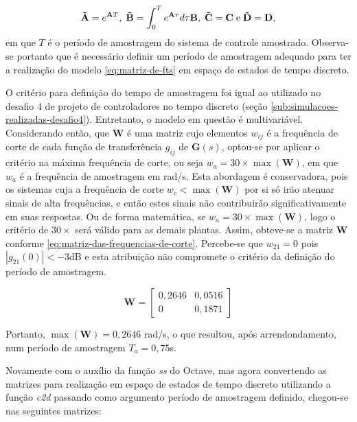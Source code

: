 \begin{equation*}
    \mathbf{\tilde{A}} = e^{\mathbf{A}T},
    \thickspace
    \mathbf{\tilde{B}} = \int_{0}^{T}e^{\mathbf{A}\tau}d\tau \mathbf{B},
    \thickspace
    \mathbf{\tilde{C}} = \mathbf{C}
    \thickspace \text{e} \thickspace
    \mathbf{\tilde{D}} = \mathbf{D},
\end{equation*} em que $T$ é o período de amostragem do sistema de controle
amostrado. Observa-se portanto que é necessário definir um período de amostragem
adequado para ter a realização do modelo \ref{eq:matriz-de-fts} em espaço de
estados de tempo discreto.

O critério para definição do tempo de amostragem foi igual ao utilizado no
desafio 4 de projeto de controladores no tempo discreto (seção
\ref{sub:simulacoes-realizadas-desafio4}). Entretanto, o modelo em questão é
multivariável. Considerando então, que $\mathbf{W}$ é uma matriz cujo elementos
$w_{ij}$ é a frequência de corte de cada função de transferência $g_{ij}$ de
$\mathbf{G}(s)$, optou-se por aplicar o critério na máxima frequência de corte,
ou seja $w_a = 30\times\max(\mathbf{W})$, em que $w_a$ é a frequência de
amostragem em rad/s. Esta abordagem é conservadora, pois os sistemas cuja a
frequência de corte $w_c < \max(\mathbf{W})$ por si só irão atenuar sinais de
alta frequências, e então estes sinais não contribuirão significativamente em
suas respostas. Ou de forma matemática, se $w_a = 30\times\max(\mathbf{W})$,
logo o critério de $30\times$ será válido para as demais plantas. Assim,
obteve-se a matriz $\mathbf{W}$ conforme
\ref{eq:matriz-das-frequencias-de-corte}. Percebe-se que $w_{21} = 0$ pois
$|g_{21}(0)| < -3$dB e esta atribuição não compromete o critério da
definição do período de amostragem.

\begin{equation}
    \label{eq:matriz-das-frequencias-de-corte}
    \mathbf{W} =
    \begin{bmatrix}
        0,2646 & 0,0516 \\
        0      & 0,1871
    \end{bmatrix}
\end{equation}

Portanto, $\max(\mathbf{W}) = 0,2646$ rad/s, o que resultou, após
arrendondamento, num período de amostragem $T_a = 0,75$s.

Novamente com o auxílio da função \textit{ss} do Octave, mas agora convertendo
as matrizes para realização em espaço de estados de tempo discreto utilizando a
função \textit{c2d} passando como argumento período de amostragem definido,
chegou-se nas seguintes matrizes:

